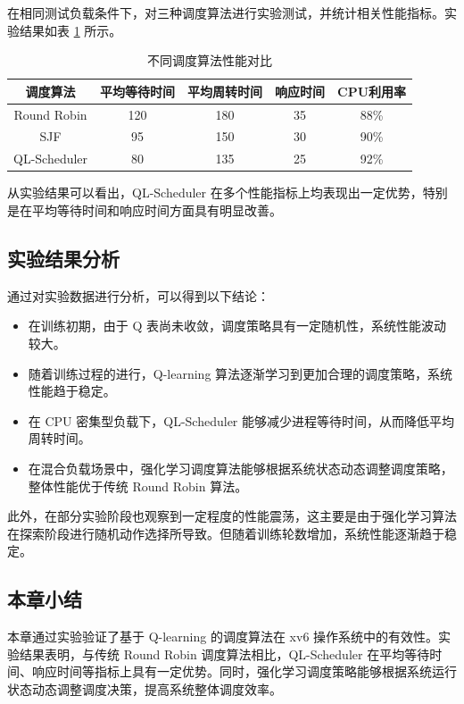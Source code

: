 在相同测试负载条件下，对三种调度算法进行实验测试，并统计相关性能指标。实验结果如表 \ref{tab:compare} 所示。

\begin{table}[htbp]
\centering
\caption{不同调度算法性能对比}
\label{tab:compare}
\begin{tabular}{ccccc}
\hline
调度算法 & 平均等待时间 & 平均周转时间 & 响应时间 & CPU利用率 \\
\hline
Round Robin & 120 & 180 & 35 & 88\% \\
SJF & 95 & 150 & 30 & 90\% \\
QL-Scheduler & 80 & 135 & 25 & 92\% \\
\hline
\end{tabular}
\end{table}

从实验结果可以看出，QL-Scheduler 在多个性能指标上均表现出一定优势，特别是在平均等待时间和响应时间方面具有明显改善。

\subsection{实验结果分析}

通过对实验数据进行分析，可以得到以下结论：

\begin{itemize}
\item 在训练初期，由于 Q 表尚未收敛，调度策略具有一定随机性，系统性能波动较大。
\item 随着训练过程的进行，Q-learning 算法逐渐学习到更加合理的调度策略，系统性能趋于稳定。
\item 在 CPU 密集型负载下，QL-Scheduler 能够减少进程等待时间，从而降低平均周转时间。
\item 在混合负载场景中，强化学习调度算法能够根据系统状态动态调整调度策略，整体性能优于传统 Round Robin 算法。
\end{itemize}

此外，在部分实验阶段也观察到一定程度的性能震荡，这主要是由于强化学习算法在探索阶段进行随机动作选择所导致。但随着训练轮数增加，系统性能逐渐趋于稳定。

\subsection{本章小结}

本章通过实验验证了基于 Q-learning 的调度算法在 xv6 操作系统中的有效性。实验结果表明，与传统 Round Robin 调度算法相比，QL-Scheduler 在平均等待时间、响应时间等指标上具有一定优势。同时，强化学习调度策略能够根据系统运行状态动态调整调度决策，提高系统整体调度效率。